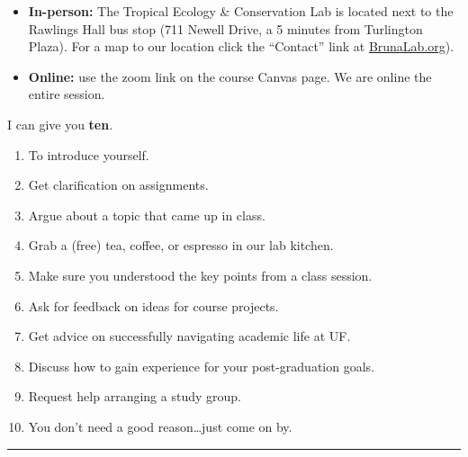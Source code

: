 \documentclass[
  10pt,
  letterpaper,
  oneside,
  open=any]{scrbook}
\providecommand{\tightlist}{%
  \setlength{\itemsep}{0pt}\setlength{\parskip}{0pt}}
\begin{document}
\begin{itemize}
\item
  \textbf{In-person:} The Tropical Ecology \& Conservation Lab is
  located next to the Rawlings Hall bus stop (711 Newell Drive, a 5
  minutes from Turlington Plaza). For a map to our location click the
  ``Contact'' link at \href{http://brunalab.org}{BrunaLab.org}).
\item
  \textbf{Online:} use the zoom link on the course Canvas page. We are
  online the entire session.
\end{itemize}

\begin{tcolorbox}[enhanced jigsaw, title=\textcolor{quarto-callout-tip-color}{\faLightbulb}\hspace{0.5em}{Can you give me \textbf{one good reason} why I should go to Office
Hours?}, left=2mm, coltitle=black, colback=white, opacitybacktitle=0.6, arc=.35mm, leftrule=.75mm, toprule=.15mm, toptitle=1mm, bottomtitle=1mm, colbacktitle=quarto-callout-tip-color!10!white, breakable, titlerule=0mm, bottomrule=.15mm, opacityback=0, rightrule=.15mm, colframe=quarto-callout-tip-color-frame]

I can give you \textbf{ten}.

\begin{enumerate}
\def\labelenumi{\arabic{enumi}.}
\tightlist
\item
  To introduce yourself.
\item
  Get clarification on assignments.
\item
  Argue about a topic that came up in class.
\item
  Grab a (free) tea, coffee, or espresso in our lab kitchen.
\item
  Make sure you understood the key points from a class session.
\item
  Ask for feedback on ideas for course projects.
\item
  Get advice on successfully navigating academic life at UF.
\item
  Discuss how to gain experience for your post-graduation goals.
\item
  Request help arranging a study group.
\item
  You don't need a good reason\ldots just come on by.
\end{enumerate}

\end{tcolorbox}

\begin{center}\rule{0.5\linewidth}{0.5pt}\end{center}
\end{document}
